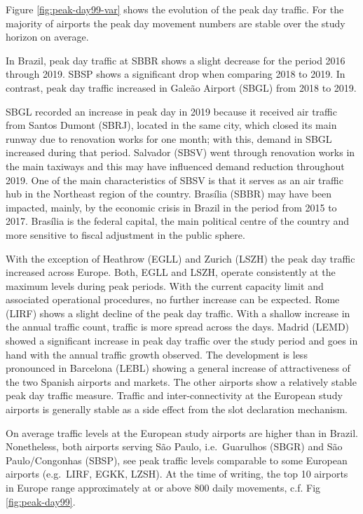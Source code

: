 \documentclass[
]{book}
\begin{document}
Figure \ref{fig:peak-day99-var} shows the evolution of the peak day traffic.
For the majority of airports the peak day movement numbers are stable over the study horizon on average.

In Brazil, peak day traffic at SBBR shows a slight decrease for the period 2016 through 2019.
SBSP shows a significant drop when comparing 2018 to 2019.
In contrast, peak day traffic increased in Galeão Airport (SBGL) from 2018 to 2019.

SBGL recorded an increase in peak day in 2019 because it received air traffic from Santos Dumont (SBRJ), located in the same city, which closed its main runway due to renovation works for one month; with this, demand in SBGL increased during that period.
Salvador (SBSV) went through renovation works in the main taxiways and this may have influenced demand reduction throughout 2019. One of the main characteristics of SBSV is that it serves as an air traffic hub in the Northeast region of the country.
Brasília (SBBR) may have been impacted, mainly, by the economic crisis in Brazil in the period from 2015 to 2017.
Brasília is the federal capital, the main political centre of the country and more sensitive to fiscal adjustment in the public sphere.

With the exception of Heathrow (EGLL) and Zurich (LSZH) the peak day traffic increased across Europe.
Both, EGLL and LSZH, operate consistently at the maximum levels during peak periods.
With the current capacity limit and associated operational procedures, no further increase can be expected.
Rome (LIRF) shows a slight decline of the peak day traffic. With a shallow increase in the annual traffic count, traffic is more spread across the days.
Madrid (LEMD) showed a significant increase in peak day traffic over the study period and goes in hand with the annual traffic growth observed. The development is less pronounced in Barcelona (LEBL) showing a general increase of attractiveness of the two Spanish airports and markets.
The other airports show a relatively stable peak day traffic measure.
Traffic and inter-connectivity at the European study airports is generally stable as a side effect from the slot declaration mechanism.

On average traffic levels at the European study airports are higher than in Brazil. Nonetheless, both airports serving São Paulo, i.e.~Guarulhos (SBGR) and São Paulo/Congonhas (SBSP), see peak traffic levels comparable to some European airports (e.g.~LIRF, EGKK, LZSH). At the time of writing, the top 10 airports in Europe range approximately at or above 800 daily movements, c.f. Fig \ref{fig:peak-day99}.
\end{document}
